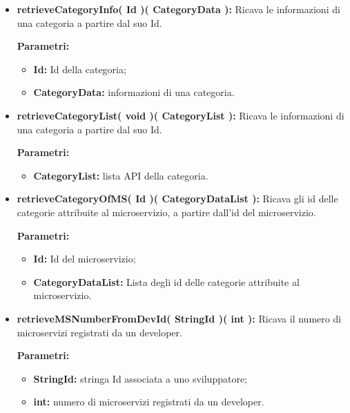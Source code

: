 \begin{itemize}
\begin{itemize}
			\item \textbf{retrieveCategoryInfo( Id )( CategoryData ):} Ricava le informazioni di una categoria a partire dal suo Id.
			\begin{description}
				\item[\textbf{Parametri:}]
			\end{description}
			\begin{itemize}
				\item \textbf{Id:} Id della categoria;
				\item \textbf{CategoryData:} informazioni di una categoria.
			\end{itemize}
				
			\item \textbf{retrieveCategoryList( void )( CategoryList ):} Ricava le informazioni di una categoria a partire dal suo Id.
			\begin{description}
				\item[\textbf{Parametri:}]
			\end{description}
			\begin{itemize}
				\item \textbf{CategoryList:} lista API della categoria.
			\end{itemize}
				
			\item \textbf{retrieveCategoryOfMS( Id )( CategoryDataList ):} Ricava gli id delle categorie attribuite al microservizio, a partire dall'id del microservizio.
				\begin{description}
    				\item[\textbf{Parametri:}]
				\end{description}
				\begin{itemize}
					\item \textbf{Id:} Id del microservizio;
					\item \textbf{CategoryDataList:} Lista degli id delle categorie attribuite al microservizio.
				\end{itemize}
				
			\item \textbf{retrieveMSNumberFromDevId( StringId )( int ):} Ricava il numero di microservizi registrati da un developer.
			\begin{description}
				\item[\textbf{Parametri:}]
			\end{description}
			\begin{itemize}
				\item \textbf{StringId:} stringa Id associata a uno sviluppatore;
				\item \textbf{int:} numero di microservizi registrati da un developer.
			\end{itemize}	
		

\end{itemize}
\end{itemize}
